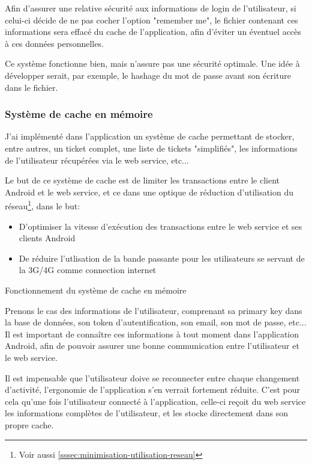 \documentclass[12pt,table,a4paper]{report}
\begin{document}
Afin d'assurer une relative sécurité aux informations de login de l'utilisateur, si celui-ci décide de ne pas cocher l'option "remember me", le fichier contenant ces informations sera effacé du cache de l'application, afin d'éviter un éventuel accès à ces données personnelles.

Ce système fonctionne bien, mais n'assure pas une sécurité optimale. Une idée à développer serait, par exemple, le hashage du mot de passe avant son écriture dans le fichier.

\subsubsection{Système de cache en mémoire}
\todo{}
J'ai implémenté dans l'application un système de cache permettant de stocker, entre autres, un ticket complet, une liste de tickets "simplifiés", les informations de l'utilisateur récupérées via le web service, etc...

Le but de ce système de cache est de limiter les transactions entre le client Android et le web service, et ce dans une optique de réduction d'utilisation du réseau\footnote{Voir aussi \ref{sssec:minimisation-utilisation-reseau}}, dans le but:

\begin{itemize}
\item{D'optimiser la vitesse d'exécution des transactions entre le web service et ses clients Android}
\item{De réduire l'utlisation de la bande passante pour les utilisateurs se servant de la 3G/4G comme connection internet}
\end{itemize}

\begin{center}
Fonctionnement du système de cache en mémoire
\end{center}

Prenons le cas des informations de l'utilisateur, comprenant sa primary key dans la base de données, son token d'autentification, son email, son mot de passe, etc... Il est important de connaître ces informations à tout moment dans l'application Android, afin de pouvoir assurer une bonne communication entre l'utilisateur et le web service.

Il est impensable que l'utilisateur doive se reconnecter entre chaque changement d'activité, l'ergonomie de l'application s'en verrait fortement réduite. C'est pour cela qu'une fois l'utilisateur connecté à l'application, celle-ci reçoit du web service les informations complètes de l'utilisateur, et les stocke directement dans son propre cache.
\end{document}
